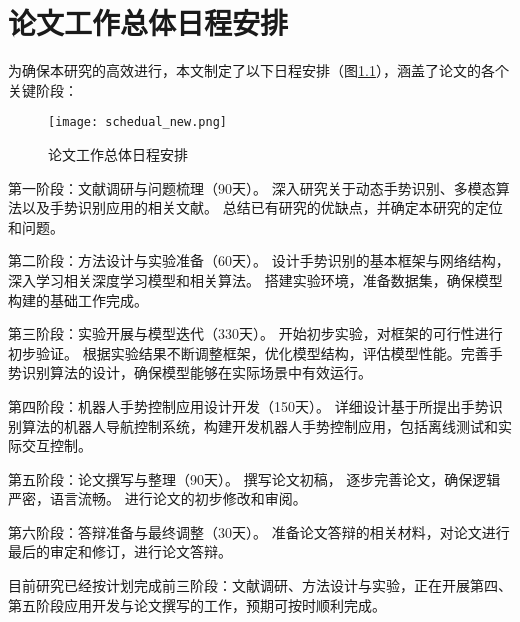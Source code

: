 
\chapter{论文工作总体日程安排}

为确保本研究的高效进行，本文制定了以下日程安排（图\ref{fig:schedual}），涵盖了论文的各个关键阶段：
\begin{figure}
  \centering
  \texttt{[image: schedual\_new.png]}
  \caption{论文工作总体日程安排}
  \label{fig:schedual}
\end{figure}

第一阶段：文献调研与问题梳理（90天）。
深入研究关于动态手势识别、多模态算法以及手势识别应用的相关文献。
总结已有研究的优缺点，并确定本研究的定位和问题。

第二阶段：方法设计与实验准备（60天）。
设计手势识别的基本框架与网络结构，深入学习相关深度学习模型和相关算法。
搭建实验环境，准备数据集，确保模型构建的基础工作完成。

第三阶段：实验开展与模型迭代（330天）。
开始初步实验，对框架的可行性进行初步验证。
根据实验结果不断调整框架，优化模型结构，评估模型性能。完善手势识别算法的设计，确保模型能够在实际场景中有效运行。

第四阶段：机器人手势控制应用设计开发（150天）。
详细设计基于所提出手势识别算法的机器人导航控制系统，构建开发机器人手势控制应用，包括离线测试和实际交互控制。

第五阶段：论文撰写与整理（90天）。
撰写论文初稿，%
逐步完善论文，确保逻辑严密，语言流畅。
进行论文的初步修改和审阅。

第六阶段：答辩准备与最终调整（30天）。
准备论文答辩的相关材料，对论文进行最后的审定和修订，进行论文答辩。

目前研究已经按计划完成前三阶段：文献调研、方法设计与实验，正在开展第四、第五阶段应用开发与论文撰写的工作，预期可按时顺利完成。





